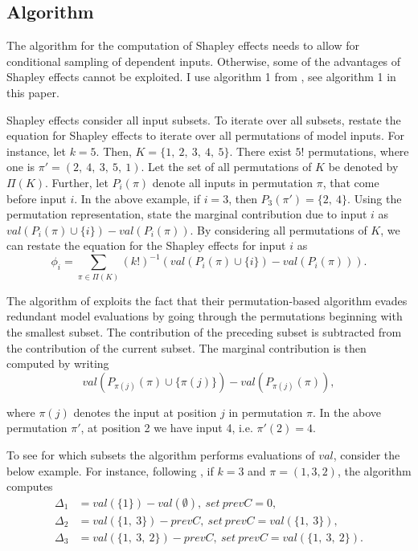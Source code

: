 \subsection{Algorithm} \label{comp_alg}

The algorithm for the computation of Shapley effects needs to allow for conditional sampling of dependent inputs. Otherwise, some of the advantages of Shapley effects cannot be exploited. I use algorithm 1 from \citet{SNS16}, see algorithm 1 in this paper.

Shapley effects consider all input subsets. To iterate over all subsets, \citet{SNS16} restate the equation for Shapley effects to iterate over all permutations of model inputs. For instance, let $k=5$. Then, $K=\{1,\ 2,\ 3,\ 4,\ 5\}$. There exist $5!$ permutations, where one is $\pi'=(2,\ 4,\ 3,\ 5,\ 1)$. Let the set of all permutations of $K$ be denoted by $\Pi(K)$. Further, let $P_i(\pi)$ denote all inputs in permutation $\pi$, that come before input $i$. In the above example, if $i=3$, then $P_3(\pi')=\{2,\ 4\}$. Using the permutation representation, \citet{SNS16} state the marginal contribution due to input $i$ as $val(P_i(\pi) \cup\{i\}) - val(P_i(\pi))$. By considering all permutations of $K$, we can restate the equation for the Shapley effects for input $i$ as
\begin{equation}
\phi_i=\sum_{\pi \in \Pi(K)} (k!)^{-1} (val(P_i(\pi) \cup\{i\}) - val(P_i(\pi))).
\end{equation}

The algorithm of \citet{SNS16} exploits the fact that their permutation-based algorithm evades redundant model evaluations by going through the permutations beginning with the smallest subset. The contribution of the preceding subset is subtracted from the contribution of the current subset. The marginal contribution is then computed by writing
\begin{equation}
val(P_{\pi(j)}(\pi) \cup \{\pi(j)\}) - val(P_{\pi(j)}(\pi)),
\end{equation}

\noindent where $\pi(j)$ denotes the input at position $j$ in permutation $\pi$. In the above permutation $\pi'$, at position 2 we have input 4, i.e. $\pi'(2)=4$.

To see for which subsets the algorithm performs evaluations of $val$, consider the below example. For instance, following \citet{SNS16}, if $k=3$ and $\pi=(1, 3, 2)$, the algorithm computes
\begin{align*}
\Delta_1 &=val(\{1\})-val(\emptyset),\ set\ prevC=0, \\
\Delta_2 &=val(\{1,\ 3\})-prevC,\ set\ prevC=val(\{1,\ 3\}), \\
\Delta_3 &=val(\{1,\ 3,\ 2\})-prevC,\ set\ prevC=val(\{1,\ 3,\ 2\}).
\end{align*}

